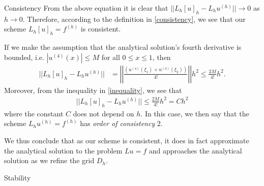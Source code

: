 \begin{subsection}{Consistency}
  From the above equation it is clear that $||L_h[u]_h - L_hu^{(h)}|| \to 0$ as $h \to 0$.
  Therefore, according to the definition in \eqref{consistency}, we see that
  our scheme $L_h[u]_h = f^{(h)}$ is consistent.

  If we make the assumption that the analytical solution's fourth derivative
  is bounded, i.e. $|u^{(4)}(x)| \leq M$ for all $0 \leq x \leq 1$, then
  \begin{align}\label{inequality}
    ||L_h[u]_h - L_hu^{(h)}||
    &= \left|\left| \frac{(u^{(4)}(\xi_1) + u^{(4)}(\xi_2))}{4!}\right|\right| h^2 \leq \frac{2M}{4!}h^2.
  \end{align}
  Moreover, from the inequality in \eqref{inequality}, we see that
  \begin{align}\label{order}
    ||L_h[u]_h - L_hu^{(h)}|| \leq \frac{2M}{4!}h^2 = Ch^2
  \end{align}
  where the constant $C$ does not depend on $h$. In this case, we then say that
  the scheme $L_h u^{(h)} = f^{(h)}$ has \textit{order of consistency} 2.

  We thus conclude that as our scheme is consistent, it does in fact approximate
  the analytical solution to the problem $Lu = f$ and approaches the analytical
  solution as we refine the grid $D_h$.
\end{subsection}

\begin{subsection}{Stability}
\end{subsection}
